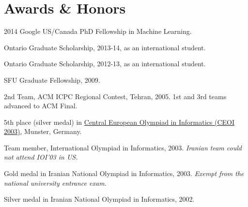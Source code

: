 \documentclass[10pt,letterpaper]{article}
\renewenvironment{itemize}{
  \begin{list}{}{
    \setlength{\leftmargin}{1.5em}
  }
}{
  \end{list}
}
\begin{document}
\section*{Awards \& Honors}

\begin{itemize}
\item 2014 Google US/Canada PhD Fellowship in Machine Learning.
\item Ontario Graduate Scholarship, 2013-14, as an international student.
\item Ontario Graduate Scholarship, 2012-13, as an international student.
\item SFU Graduate Fellowship, 2009.
\item 2nd Team, ACM ICPC Regional Contest, Tehran, 2005. 1st and 3rd teams advanced to ACM Final.
\item 5th place (silver medal) in \href{http://www.ceoi2003.de/www/}{Central European Olympiad in Informatics (CEOI 2003)}, Munster, Germany.
\item Team member, International Olympiad in Informatics, 2003. {\em Iranian team could not attend IOI'03 in US.}
\item Gold medal in Iranian National Olympiad in Informatics, 2003. {\em Exempt from the national university entrance exam.}
\item Silver medal in Iranian National Olympiad in Informatics, 2002.
\end{itemize}


\end{document}
